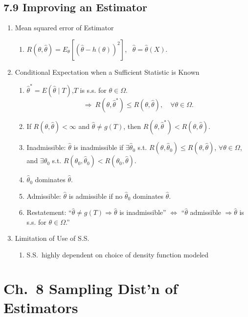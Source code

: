 \documentclass[11pt]{article}
\begin{document}
\subsection*{7.9 Improving an Estimator}
\begin{enumerate}[label=\Roman*.]
  \item Mean squared error of Estimator
  \begin{enumerate}[label=\Alph*.]
    \item $R(\theta,\hat\theta)=E_{\theta}\!\left[(\hat\theta-h(\theta))^{2}\right]$, \ $\hat\theta=\hat\theta(X)$.
  \end{enumerate}
  \item Conditional Expectation when a Sufficient Statistic is Known
  \begin{enumerate}[label=\Alph*.]
    \item $\hat\theta^{*}=E(\hat\theta\mid T)$,\quad $T$ is s.s. for $\theta\in\Omega$.
    \[
      \Rightarrow\ R(\theta,\hat\theta^{*})\le R(\theta,\hat\theta),\quad \forall\theta\in\Omega.
    \]
    \item If $R(\theta,\hat\theta)<\infty$ and $\hat\theta\ne g(T)$, then $R(\theta,\hat\theta^{*})<R(\theta,\hat\theta)$.
    \item Inadmissible: $\hat\theta$ is inadmissible if $\exists\hat\theta_{0}$ s.t. $R(\theta,\hat\theta_{0})\le R(\theta,\hat\theta)$, $\forall\theta\in\Omega$, and $\exists\theta_{0}$ s.t. $R(\theta_{0},\hat\theta_{0})<R(\theta_{0},\hat\theta)$.
    \item $\hat\theta_{0}$ dominates $\hat\theta$.
    \item Admissible: $\hat\theta$ is admissible if no $\hat\theta_{0}$ dominates $\hat\theta$.
    \item Restatement: ``$\hat\theta\ne g(T)\Rightarrow \hat\theta$ is inadmissible'' $\Leftrightarrow$ ``$\hat\theta$ admissible $\Rightarrow \hat\theta$ is s.s. for $\theta\in\Omega$.''
  \end{enumerate}
  \item Limitation of Use of S.S.
  \begin{enumerate}[label=\Alph*.]
    \item S.S.\ highly dependent on choice of density function modeled
  \end{enumerate}
\end{enumerate}

\section*{Ch.\ 8 Sampling Dist'n of Estimators}
\end{document}
